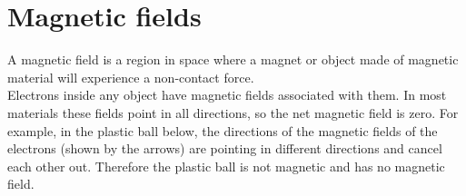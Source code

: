 \section{Magnetic fields} 

A magnetic field is a region in space where a magnet or object made of magnetic material will experience a non-contact force. \\

Electrons inside any object have magnetic fields associated
with them.  In most materials these fields point in all
directions, so the net magnetic field is zero. For example, in the plastic ball below,
the directions of the magnetic fields of the electrons (shown by the arrows) are pointing
in different directions and cancel each other out. Therefore the plastic ball is not magnetic and 
has no magnetic field.

